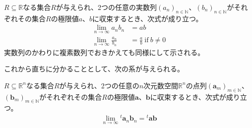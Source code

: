 \documentclass[dvipdfmx]{jsarticle}
\begin{document}
\begin{thm}\label{4.1.4.9}
$R \subseteq \mathbb{R}$なる集合$R$が与えられ、2つの任意の実数列$\left( a_{n} \right)_{n \in \mathbb{N}}$、$\left( b_{n} \right)_{n \in \mathbb{N}}$がそれぞれその集合$R$の極限値$a$、$b$に収束するとき、次式が成り立つ。
\begin{align*}
\lim_{n \rightarrow \infty}{a_{n}b_{n}} &= ab\\
\lim_{n \rightarrow \infty}\frac{a_{n}}{b_{n}} &= \frac{a}{b}\ \mathrm{if}\ b \neq 0
\end{align*}
実数列のかわりに複素数列でおきかえても同様にして示される。
\end{thm}\par
これから直ちに分かることとして、次の系が与えられる。
\begin{thm}\label{4.1.4.9s}
$R \subseteq \mathbb{R}^{n}$なる集合$R$が与えられ、2つの任意の$n$次元数空間$\mathbb{R}^{n}$の点列$\left( \mathbf{a}_{m} \right)_{m \in \mathbb{N}}$、$\left( \mathbf{b}_{m} \right)_{m \in \mathbb{N}}$がそれぞれその集合$R$の極限値$\mathbf{a}$、$\mathbf{b}$に収束するとき、次式が成り立つ。
\begin{align*}
\lim_{n \rightarrow \infty}{{}^{t}\mathbf{a}_{n}\mathbf{b}_{n}} ={}^{t}\mathbf{ab}
\end{align*}
\end{thm}
\end{document}
